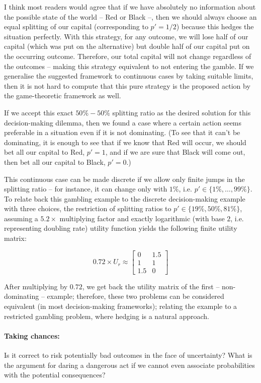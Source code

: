 \documentclass{article}
\begin{document}
I think most readers would agree that if we have absolutely no information about the possible state of the world -- Red or Black --, then we should always choose an equal splitting of our capital (corresponding to $p'=1/2$) because this hedges the situation perfectly. With this strategy, for any outcome, we will lose half of our capital (which was put on the alternative) but double half of our capital put on the occurring outcome. Therefore, our total capital will not change regardless of the outcomes -- making this strategy equivalent to not entering the gamble.
If we generalise the suggested framework to continuous cases by taking suitable limits, then it is not hard to compute that this pure strategy is the proposed action by the game-theoretic framework as well.

If we accept this exact $50\%-50\%$ splitting ratio as the desired solution for this decision-making dilemma, then we found a case where a certain action seems preferable in a situation even if it is not dominating. (To see that it can't be dominating, it is enough to see that if we know that Red will occur, we should bet all our capital to Red, $p'=1$, and if we are sure that Black will come out, then bet all our capital to Black, $p'=0$.)

This continuous case can be made discrete if we allow only finite jumps in the splitting ratio -- for instance, it can change only with $1\%$, i.e. $p' \in \{1\%,\dots,99\% \}$.
To relate back this gambling example to the discrete decision-making example with three choices, the restriction of splitting ratios to $p' \in \{19\%, 50\%, 81\% \}$, assuming a $5.2\times$ multiplying factor and exactly logarithmic (with base $2$, i.e. representing doubling rate) utility function yields the following finite utility matrix:

\[
0.72 \times U_r \approx
\begin{bmatrix}
    0 & 1.5 \\
    1 & 1 \\
    1.5 & 0
\end{bmatrix}
\]

After multiplying by $0.72$, we get back the utility matrix of the first -- non-dominating -- example; therefore, these two problems can be considered equivalent (in most decision-making frameworks); relating the example to a restricted gambling problem, where hedging is a natural approach.

\paragraph{Taking chances:}
\label{par:TakingChances}
Is it correct to risk potentially bad outcomes in the face of uncertainty? What is the argument for daring a dangerous act if we cannot even associate probabilities with the potential consequences?
\end{document}
